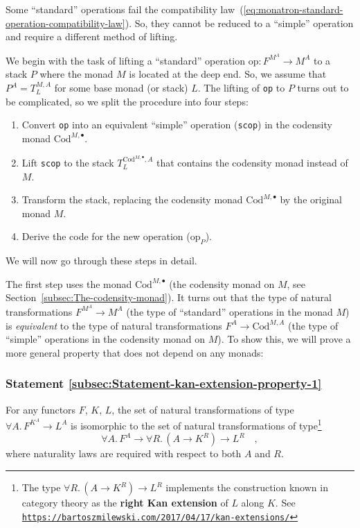 Some \textsf{``}standard\textsf{''} operations fail the compatibility law~(\ref{eq:monatron-standard-operation-compatibility-law}).
So, they cannot be reduced to a \textsf{``}simple\textsf{''} operation and require
a different method of lifting.

We begin with the task of lifting a \textsf{``}standard\textsf{''} operation $\text{op}:F^{M^{A}}\rightarrow M^{A}$
to a stack $P$ where the monad $M$ is located at the deep end. So,
we assume that $P^{A}=T_{L}^{M,A}$ for some base monad (or stack)
$L$. The lifting of \lstinline!op! to $P$ turns out to be complicated,
so we split the procedure into four steps:
\begin{enumerate}
\item Convert \lstinline!op! into an equivalent \textsf{``}simple\textsf{''} operation
(\lstinline!scop!) in the codensity monad $\text{Cod}^{M,\bullet}$.
\item Lift \lstinline!scop! to the stack $T_{L}^{\text{Cod}^{M,\bullet},A}$
that contains the codensity monad instead of $M$.
\item Transform the stack, replacing the codensity monad $\text{Cod}^{M,\bullet}$
by the original monad $M$.
\item Derive the code for the new operation ($\text{op}_{P}$).
\end{enumerate}
We will now go through these steps in detail.

The first step uses the monad $\text{Cod}^{M,\bullet}$ (the codensity
monad on $M$, see Section~\ref{subsec:The-codensity-monad}). It
turns out that the type of natural transformations $F^{M^{A}}\rightarrow M^{A}$
(the type of \textsf{``}standard\textsf{''} operations in the monad $M$) is \emph{equivalent}
to the type of natural transformations $F^{A}\rightarrow\text{Cod}^{M,A}$
(the type of \textsf{``}simple\textsf{''} operations in the codensity monad on $M$).
To show this, we will prove a more general property that does not
depend on any monads:

\subsubsection{Statement \label{subsec:Statement-kan-extension-property-1}\ref{subsec:Statement-kan-extension-property-1}}

For any functors $F$, $K$, $L$, the set of natural transformations
of type $\forall A.\,F^{K^{A}}\rightarrow L^{A}$ is isomorphic to
the set of natural transformations of type\footnote{The type $\forall R.\,(A\rightarrow K^{R})\rightarrow L^{R}$ implements
the construction known in category theory as the \textbf{right Kan
extension} of $L$ along $K$. See \texttt{\href{https://bartoszmilewski.com/2017/04/17/kan-extensions/}{https://bartoszmilewski.com/2017/04/17/kan-extensions/}}}
\[
\forall A.\,F^{A}\rightarrow\forall R.\,(A\rightarrow K^{R})\rightarrow L^{R}\quad,
\]
where naturality laws are required with respect to both $A$ and $R$.

